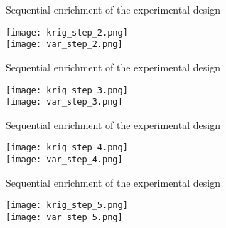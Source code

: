 \documentclass[9pt]{beamer}
\begin{document}

\begin{frame}{Sequential enrichment of the experimental design}

\begin{center}
\texttt{[image: krig\_step\_2.png]}\\
\texttt{[image: var\_step\_2.png]}
\end{center}

\end{frame}


\begin{frame}{Sequential enrichment of the experimental design}

\begin{center}
\texttt{[image: krig\_step\_3.png]}\\
\texttt{[image: var\_step\_3.png]}
\end{center}

\end{frame}


\begin{frame}{Sequential enrichment of the experimental design}

\begin{center}
\texttt{[image: krig\_step\_4.png]}\\
\texttt{[image: var\_step\_4.png]}
\end{center}

\end{frame}


\begin{frame}{Sequential enrichment of the experimental design}

\begin{center}
\texttt{[image: krig\_step\_5.png]}\\
\texttt{[image: var\_step\_5.png]}
\end{center}

\end{frame}
\end{document}
